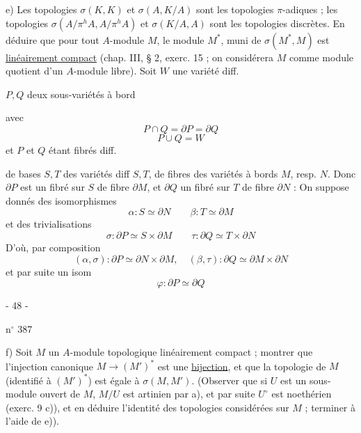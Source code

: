 e) Les topologies $\sigma(K,K)$ et $\sigma(A,K/A)$ sont les topologies $\pi$-adiques ; les topologies $\sigma(A/\pi^h A,A/\pi^h A)$ et $\sigma(K/A,A)$ sont les topologies discrètes. En déduire que pour tout $A$-module $M$, le module $M^*$, muni de $\sigma(M^*,M)$ est \uline{linéairement compact} (chap. III, § 2, exerc. 15 ; on considérera $M$ comme module quotient d'un $A$-module libre).
Soit $W$ une variété  diff.

$P,Q$ deux sous-variétés à bord

avec
\[
P\cap Q=\partial P=\partial Q
\]
\[
P\cup Q=W
\]
et $P$ et $Q$ étant  fibrés diff.

de bases $S,T$ des variétés diff  $S,T$, de fibres des variétés à bords $M$, resp. $N$. Donc $\partial P$ est un fibré sur $S$ de fibre $\partial M$, et $\partial Q$ un fibré sur $T$ de fibre $\partial N$ :
On suppose donnés des isomorphismes
\[
\alpha:S\simeq\partial N\qquad\beta:T\simeq\partial M
\]
et  des trivialisations
\[
\sigma:\partial P\simeq S\times\partial M\qquad\tau:\partial Q\simeq T\times\partial N
\]
D'où, par composition
\[
(\alpha,\sigma):\partial P\simeq\partial N\times\partial M,\quad(\beta,\tau):\partial Q\simeq\partial M\times\partial N
\]
et par suite un isom
\[
\varphi:\partial P\simeq\partial Q
\]
\begin{center}- 48 -\end{center}
\hfill n$^\circ$ 387

f) Soit $M$ un $A$-module topologique linéairement compact ; montrer que l'injection canonique $M\longrightarrow(M')^*$ est une \uline{bijection}, et que la topologie de $M$ (identifié à $(M')^*$) est égale à $\sigma(M,M')$. (Observer que si $U$ est un sous-module ouvert de $M$, $M/U$ est artinien par a), et par suite $U^\circ$ est noethérien (exerc. 9 c)), et en déduire l'identité des topologies considérées sur $M$ ; terminer à l'aide de e)).

